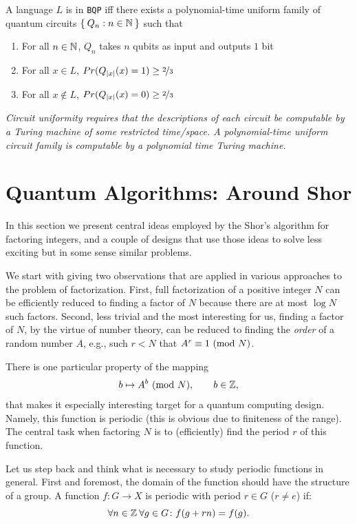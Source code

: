 \documentclass{article}
\begin{document}
\begin{defn}[BQP]
A language $L$ is in \texttt{BQP} iff there exists a polynomial-time uniform family of quantum circuits $\Set{Q_n : n \in \ensuremath{\mathbb N}}$ such that
\begin{enumerate}
    \item For all $n \in \mathbb N$, $Q_n$ takes $n$ qubits as input and outputs $1$ bit
    \item For all $x \in L$, $Pr(Q_{|x|}(x) = 1) \geq \nicefrac{2}{3}$
    \item For all $x \not \in L$, $Pr(Q_{|x|}(x) = 0) \geq \nicefrac{2}{3}$
\end{enumerate}
\end{defn}

\textit{Circuit uniformity requires that the descriptions of each circuit be computable by a Turing machine of some restricted time/space. A polynomial-time uniform circuit family is computable by a polynomial time Turing machine.}


\section{Quantum Algorithms: Around Shor}

In this section we present central ideas employed by the Shor's 
algorithm for factoring integers, and a couple of designs that use those 
ideas to solve less exciting but in some sense similar problems.

We start with giving two observations that are applied
in various approaches to the problem of factorization. First, full 
factorization of a positive integer $N$ can be efficiently reduced to 
finding a factor of $N$ because there are at most $\log N$ such factors. 
Second, less trivial and the most interesting for us, finding a factor of $N$,
by the virtue of number theory, can be reduced to finding the \emph{order} of a
random number $A$, e.g., such $r < N$ that $A^r \equiv 1 \ (\mathrm{mod}\ N)$.

There is one particular property of the mapping
\[
  b \mapsto A^b \ (\mathrm{mod}\ N), \qquad b\in\mathbb Z,
\]
that makes it especially interesting target for a quantum computing design. Namely,
this function is periodic (this is obvious due to finiteness of the range). The 
central task when factoring $N$ is to (efficiently) find the period $r$ of this function.

Let us step back and think what is necessary to study periodic functions in general.
First and foremost, the domain of the function should have the structure of a
group. A function $f\colon G \to X$ is periodic with period $r\in G$ ($r\neq e$) if:
\[
   \forall n\in\mathbb Z\: \forall g\in G\colon f(g+rn) = f(g).
\]
\end{document}
